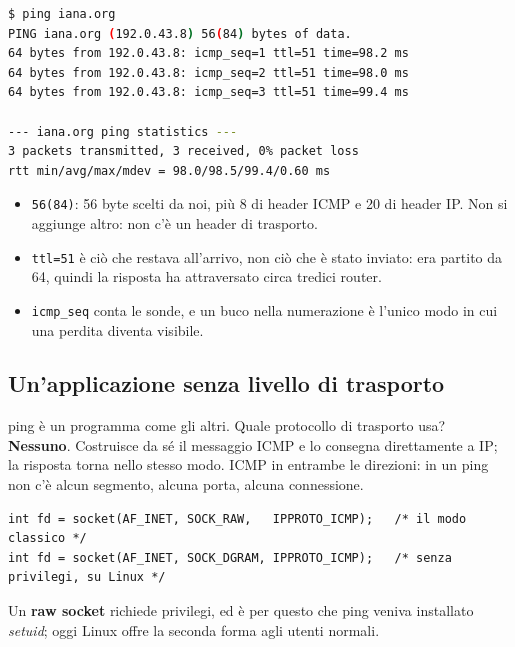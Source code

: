 \begin{lstlisting}[language=bash, title={Leggere un ping}]
$ ping iana.org
PING iana.org (192.0.43.8) 56(84) bytes of data.
64 bytes from 192.0.43.8: icmp_seq=1 ttl=51 time=98.2 ms
64 bytes from 192.0.43.8: icmp_seq=2 ttl=51 time=98.0 ms
64 bytes from 192.0.43.8: icmp_seq=3 ttl=51 time=99.4 ms

--- iana.org ping statistics ---
3 packets transmitted, 3 received, 0% packet loss
rtt min/avg/max/mdev = 98.0/98.5/99.4/0.60 ms
\end{lstlisting}

\begin{itemize}
    \item \texttt{56(84)}: 56 byte scelti da noi, più 8 di header ICMP e 20 di header IP. Non si aggiunge altro: non c'è un
          header di trasporto.
    \item \texttt{ttl=51} è ciò che restava all'arrivo, non ciò che è stato inviato: era partito da 64, quindi la risposta ha
          attraversato circa tredici router.
    \item \texttt{icmp\_seq} conta le sonde, e un buco nella numerazione è l'unico modo in cui una perdita diventa visibile.
\end{itemize}

\subsection{Un'applicazione senza livello di trasporto}

ping è un programma come gli altri. Quale protocollo di trasporto usa? \textbf{Nessuno}. Costruisce da sé il messaggio
ICMP e lo consegna direttamente a IP; la risposta torna nello stesso modo. ICMP in entrambe le direzioni: in un ping non c'è
alcun segmento, alcuna porta, alcuna connessione.

\begin{lstlisting}[language={[POSIX]C}, style=wnumbers, title={I due modi di aprire un socket ICMP}]
int fd = socket(AF_INET, SOCK_RAW,   IPPROTO_ICMP);   /* il modo classico */
int fd = socket(AF_INET, SOCK_DGRAM, IPPROTO_ICMP);   /* senza privilegi, su Linux */
\end{lstlisting}

Un \textbf{raw socket} richiede privilegi, ed è per questo che ping veniva installato \emph{setuid}; oggi Linux offre la
seconda forma agli utenti normali.



